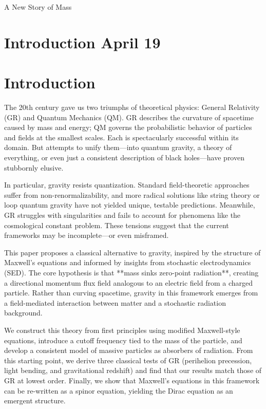 \documentclass {article}
\begin{document}
A New Story of Mass


\newpage

\section{Introduction April 19}

\section{Introduction}

The 20th century gave us two triumphs of theoretical physics: General Relativity (GR) and Quantum Mechanics (QM). GR describes the curvature of spacetime caused by mass and energy; QM governs the probabilistic behavior of particles and fields at the smallest scales. Each is spectacularly successful within its domain. But attempts to unify them—into quantum gravity, a theory of everything, or even just a consistent description of black holes—have proven stubbornly elusive.

In particular, gravity resists quantization. Standard field-theoretic approaches suffer from non-renormalizability, and more radical solutions like string theory or loop quantum gravity have not yielded unique, testable predictions. Meanwhile, GR struggles with singularities and fails to account for phenomena like the cosmological constant problem. These tensions suggest that the current frameworks may be incomplete—or even misframed.

This paper proposes a classical alternative to gravity, inspired by the structure of Maxwell’s equations and informed by insights from stochastic electrodynamics (SED). The core hypothesis is that **mass sinks zero-point radiation**, creating a directional momentum flux field analogous to an electric field from a charged particle. Rather than curving spacetime, gravity in this framework emerges from a field-mediated interaction between matter and a stochastic radiation background.

We construct this theory from first principles using modified Maxwell-style equations, introduce a cutoff frequency tied to the mass of the particle, and develop a consistent model of massive particles as absorbers of radiation. From this starting point, we derive three classical tests of GR (perihelion precession, light bending, and gravitational redshift) and find that our results match those of GR at lowest order. Finally, we show that Maxwell's equations in this framework can be re-written as a spinor equation, yielding the Dirac equation as an emergent structure.
\end{document}
